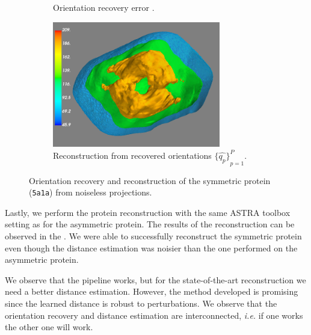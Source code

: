 \begin{figure}[ht!]
\begin{subfigure}[b]{0.45\textwidth}
        \caption{Orientation recovery error .}
    \end{subfigure}
    \hfill
    \begin{subfigure}[b]{0.45\textwidth}
        \centering
        \includegraphics[height=5.5cm]{figures/5a1a_aligned}
        \caption{Reconstruction from recovered orientations ${\big\{\widehat{q_p}\big\}}_{p=1}^P$.}
    \end{subfigure}
    \caption{
        Orientation recovery and reconstruction of the symmetric protein (\texttt{5a1a}) from noiseless projections.
    }\label{fig:5a1a-orientation-recovery-loss}
    \label{fig:angle-alignment-5a1a-noise0}
    \label{fig:5a1a-reconstruction-noise0}
\end{figure}

Lastly, we perform the protein reconstruction with the same ASTRA toolbox setting as for the asymmetric protein. The results of the reconstruction can be observed in the .
We were able to successfully reconstruct the symmetric protein even though the distance estimation was noisier than the one performed on the asymmetric protein.

We observe that the pipeline works, but for the state-of-the-art reconstruction we need a better distance estimation.
However, the method developed is promising since the learned distance is robust to perturbations.
We observe that the orientation recovery and distance estimation are interconnected, \textit{i.e.} if one works the other one will work.
